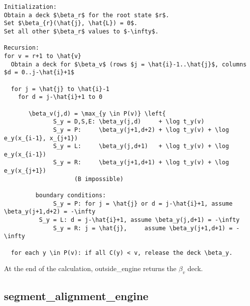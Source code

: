 \documentclass[11pt]{article}
\begin{document}
\begin{verbatim}
Initialization:
Obtain a deck $\beta_r$ for the root state $r$.
Set $\beta_{r}(\hat{j}, \hat{L}) = 0$.
Set all other $\beta_r$ values to $-\infty$.

Recursion:
for v = r+1 to \hat{v}
  Obtain a deck for $\beta_v$ (rows $j = \hat{i}-1..\hat{j}$, columns $d = 0..j-\hat{i}+1$
  
  for j = \hat{j} to \hat{i}-1
    for d = j-\hat{i}+1 to 0
       
       \beta_v(j,d) = \max_{y \in P(v)} \left{ 
              S_y = D,S,E: \beta_y(j,d)     + \log t_y(v) 
              S_y = P:     \beta_y(j+1,d+2) + \log t_y(v) + \log e_y(x_{i-1}, x_{j+1})
              S_y = L:     \beta_y(j,d+1)   + \log t_y(v) + \log e_y(x_{i-1})
              S_y = R:     \beta_y(j+1,d+1) + \log t_y(v) + \log e_y(x_{j+1})
                    (B impossible)

         boundary conditions:
              S_y = P: for j = \hat{j} or d = j-\hat{i}+1, assume \beta_y(j+1,d+2) = -\infty
	      S_y = L: d = j-\hat{i}+1, assume \beta_y(j,d+1) = -\infty
              S_y = R: j = \hat{j},     assume \beta_y(j+1,d+1) = -\infty

  for each y \in P(v): if all C(y) < v, release the deck \beta_y.
\end{verbatim}

At the end of the calculation, outside\_engine returns the $\beta_v$
deck.


\subsection{segment\_alignment\_engine}




\end{document}
